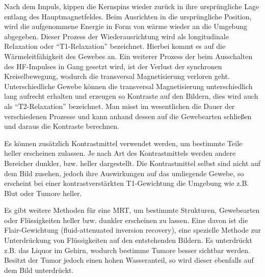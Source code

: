 Nach dem Impuls, kippen die Kernspins wieder zurück in ihre ursprüngliche Lage entlang des Hauptmagnetfeldes. Beim Ausrichten in die ursprüngliche Position, wird die aufgenommene Energie in Form von wärme wieder an die Umgebung abgegeben. Dieser Prozess der Wiederausrichtung wird als longitudinale Relaxation oder ``T1-Relaxation'' bezeichnet. Hierbei kommt es auf die Wärmeleitfähigkeit des Gewebes an. Ein weiterer Prozess der beim Ausschalten des HF-Impulses in Gang gesetzt wird, ist der Verlust der synchronen Kreiselbewegung, wodurch die transversal Magnetisierung verloren geht. Unterschiedliche Gewebe können die transversal Magnetisierung unterschiedlich lang aufrecht erhalten und erzeugen so Kontraste auf den Bildern, dies wird auch als ``T2-Relaxation'' bezeichnet. Man misst im wesentlichen die Dauer der verschiedenen Prozesse und kann anhand dessen auf die Gewebearten schließen und daraus die Kontraste berechnen.\cite[vgl.][]{Kernspin2022}

Es können zusätzlich Kontrastmittel verwendet werden, um bestimmte Teile heller erscheinen zulassen. Je nach Art des Kontrastmittels werden andere Bereicher dunkler, bzw. heller dargestellt. Die Kontrastmittel selbst sind nicht auf dem Bild zusehen, jedoch ihre Auswirkungen auf das umliegende Gewebe, so erscheint bei einer kontrastverstärkten T1-Gewichtung die Umgebung wie z.B. Blut oder Tumore heller. \cite[vgl.][]{ChristophPabst2013}

Es gibt weitere Methoden für eine \ac{MRT}, um bestimmte Strukturen, Gewebearten oder Flüssigkeiten heller bzw. dunkler erscheinen zu lassen. Eine davon ist die Flair-Gewichtung (fluid-attenuated inversion recovery), eine spezielle Methode zur Unterdrückung von Flüssigkeiten auf den entstehenden Bildern. Es unterdrückt z.B. das Liquor im Gehirn, wodurch bestimme Tumore besser sichtbar werden. Besitzt der Tumor jedoch einen hohen Wasseranteil, so wird dieser ebenfalls auf dem Bild unterdrückt. \cite[vgl.][]{Gizewski2001}